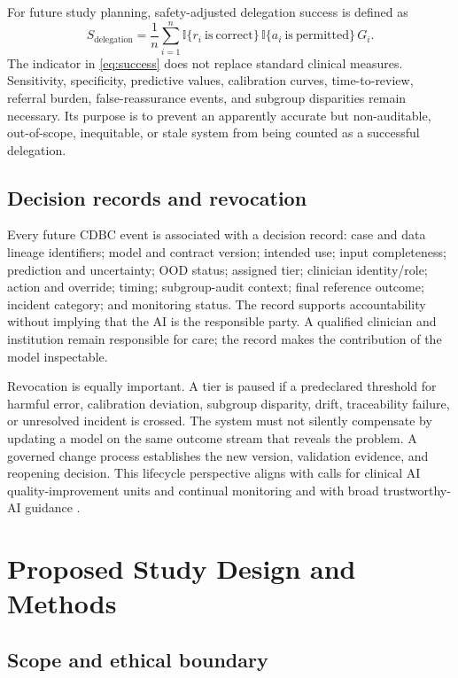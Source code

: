 \documentclass[conference]{IEEEtran}
\begin{document}
For future study planning, safety-adjusted delegation success is defined as
\begin{equation}
S_{\mathrm{delegation}}=\frac{1}{n}\sum_{i=1}^{n}\mathbb{I}\{r_i\ \mathrm{is\ correct}\}\,\mathbb{I}\{a_i\ \mathrm{is\ permitted}\}\,G_i.
\label{eq:success}
\end{equation}
The indicator in \eqref{eq:success} does not replace standard clinical measures. Sensitivity, specificity, predictive values, calibration curves, time-to-review, referral burden, false-reassurance events, and subgroup disparities remain necessary. Its purpose is to prevent an apparently accurate but non-auditable, out-of-scope, inequitable, or stale system from being counted as a successful delegation.

\subsection{Decision records and revocation}

Every future CDBC event is associated with a decision record: case and data lineage identifiers; model and contract version; intended use; input completeness; prediction and uncertainty; OOD status; assigned tier; clinician identity/role; action and override; timing; subgroup-audit context; final reference outcome; incident category; and monitoring status. The record supports accountability without implying that the AI is the responsible party. A qualified clinician and institution remain responsible for care; the record makes the contribution of the model inspectable.

Revocation is equally important. A tier is paused if a predeclared threshold for harmful error, calibration deviation, subgroup disparity, drift, traceability failure, or unresolved incident is crossed. The system must not silently compensate by updating a model on the same outcome stream that reveals the problem. A governed change process establishes the new version, validation evidence, and reopening decision. This lifecycle perspective aligns with calls for clinical AI quality-improvement units and continual monitoring \cite{feng2022} and with broad trustworthy-AI guidance \cite{who2021,nist2023,futureai2025}.

\section{Proposed Study Design and Methods}

\subsection{Scope and ethical boundary}
\end{document}
